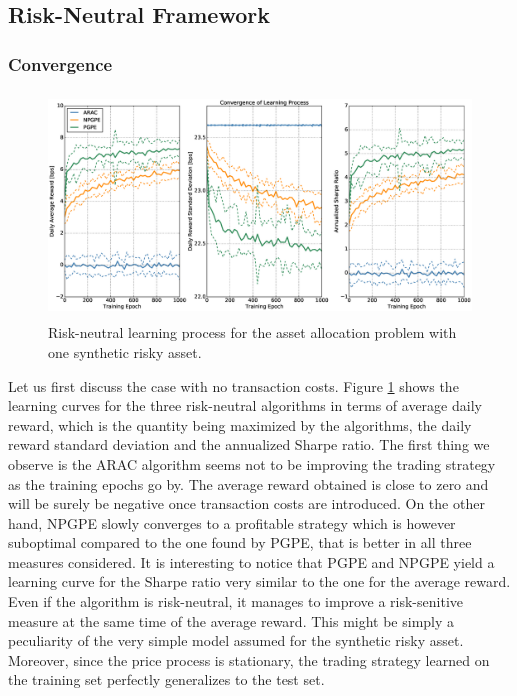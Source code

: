 \subsection{Risk-Neutral Framework}
\subsubsection{Convergence}
\begin{figure}[t!]
	\centering
	\includegraphics[height=6cm,width=1.0\textwidth]{Images/6_0_single_synthetic_neutral_convergence}
	\caption[Risk-neutral learning process for one synthetic risky asset]{Risk-neutral learning process for the asset allocation problem with one synthetic risky asset.}
	\label{fig:single_synthetic_neutral_convergence}
\end{figure}
Let us first discuss the case with no transaction costs. Figure \ref{fig:single_synthetic_neutral_convergence} shows the learning curves for the three risk-neutral algorithms in terms of average daily reward, which is the quantity being maximized by the algorithms, the daily reward standard deviation and the annualized Sharpe ratio. The first thing we observe is the \gls{ARAC} algorithm seems not to be improving the trading strategy as the training epochs go by. The average reward obtained is close to zero and will be surely be negative once transaction costs are introduced. On the other hand, \gls{NPGPE} slowly converges to a profitable strategy which is however suboptimal compared to the one found by \gls{PGPE}, that is better in all three measures considered. It is interesting to notice that \gls{PGPE} and \gls{NPGPE} yield a learning curve for the Sharpe ratio very similar to the one for the average reward. Even if the algorithm is risk-neutral, it manages to improve a risk-senitive measure at the same time of the average reward. This might be simply a peculiarity of the very simple model assumed for the synthetic risky asset. Moreover, since the price process is stationary, the trading strategy learned on the training set perfectly generalizes to the test set. 

